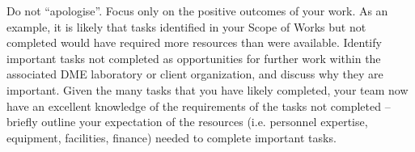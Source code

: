 Do not “apologise”.  Focus only on the positive outcomes of your work.  As an example, it is likely that tasks identified in your Scope of Works but not completed would have required more resources than were available.  Identify important tasks not completed as opportunities for further work within the associated DME laboratory or client organization, and discuss why they are important.  Given the many tasks that you have likely completed, your team now have an excellent knowledge of the requirements of the tasks not completed – briefly outline your expectation of the resources (i.e. personnel expertise, equipment, facilities, finance) needed to complete important tasks.
\color{black}